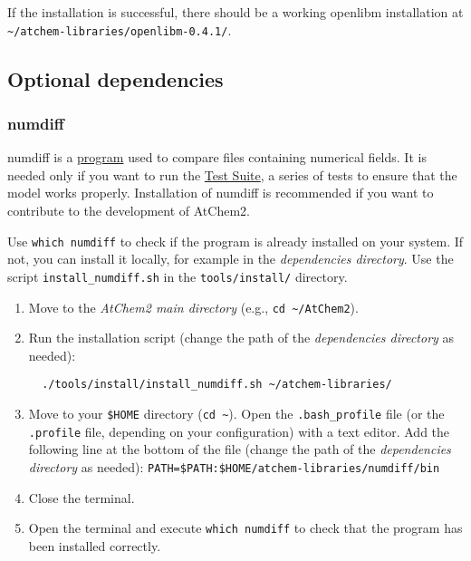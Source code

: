 If the installation is successful, there should be a working openlibm
installation at
\texttt{\textasciitilde{}/atchem-libraries/openlibm-0.4.1/}.

\subsection{Optional dependencies} \label{subsec:optional-dependencies}

\subsubsection{numdiff} \label{numdiff}

numdiff is a \href{https://www.nongnu.org/numdiff/}{program} used to
compare files containing numerical fields. It is needed only if you
want to run the \hyperref[sec:testsuite]{Test Suite}, a series of
tests to ensure that the model works properly. Installation of numdiff
is recommended if you want to contribute to the development of
AtChem2.

Use \texttt{which\ numdiff} to check if the program is already
installed on your system. If not, you can install it locally, for
example in the \emph{dependencies directory}. Use the script
\texttt{install\_numdiff.sh} in the \texttt{tools/install/} directory.

\begin{enumerate}
\item Move to the \emph{AtChem2 main directory} (e.g., \texttt{cd\
    \textasciitilde{}/AtChem2}).
\item Run the installation script (change the path of the
  \emph{dependencies directory} as needed):
  \begin{verbatim}
  ./tools/install/install_numdiff.sh ~/atchem-libraries/
  \end{verbatim}
\item Move to your \texttt{\$HOME} directory (\texttt{cd\
    \textasciitilde{}}). Open the \texttt{.bash\_profile} file (or the
  \texttt{.profile} file, depending on your configuration) with a text
  editor. Add the following line at the bottom of the file (change the
  path of the \emph{dependencies directory} as needed):
  \texttt{PATH=\$PATH:\$HOME/atchem-libraries/numdiff/bin}
\item Close the terminal.
\item Open the terminal and execute \texttt{which\ numdiff} to check
  that the program has been installed correctly.
\end{enumerate}

